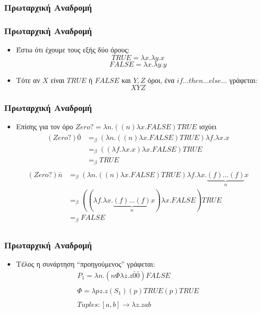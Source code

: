 \documentclass{beamer}
\begin{document}
\subsubsection{Πρωταρχική Αναδρομή}

\begin{frame}
  \frametitle{Πρωταρχική Αναδρομή}
  \begin{itemize}
  \item Έστω ότι έχουμε τους εξής δύο όρους:
    $$ TRUE = \lambda x. \lambda y. x $$
    $$ FALSE = \lambda x. \lambda y. y $$
    \pause
  \item Τότε αν $X$ είναι $TRUE$ ή $FALSE$ και $Y,Z$ όροι, ένα
    $if\ldots then \ldots else \ldots$ γράφεται:
    $$ XYZ $$
  \end{itemize}
\end{frame}

\begin{frame}
  \frametitle{Πρωταρχική Αναδρομή}
  \begin{itemize}
  \item Επίσης για τον όρο $Zero? = \lambda n. ((n) \lambda x . FALSE)
    TRUE$ ισχύει \pause
    $$
    \begin{array}{ll}
      (Zero?) \bar{0} & =_\beta (\lambda n. ((n) \lambda x . FALSE)
      TRUE) \lambda f. \lambda x. x \\
      & =_\beta ((\lambda f. \lambda x. x) \lambda x . FALSE) TRUE \\
      & =_\beta TRUE \\
    \end{array}
    $$                
    \pause
    $$
    \begin{array}{ll}
      (Zero?) \bar{n} & =_\beta (\lambda n. ((n) \lambda x . FALSE)
      TRUE) \lambda f . \lambda x . \underbrace{(f) \ldots (f)}_n x \\
      & =_\beta ((\lambda f . \lambda x . \underbrace{(f) \ldots (f)}_n
      x) \lambda x . FALSE) TRUE \\ & =_\beta FALSE \\
    \end{array}
    $$                
  \end{itemize}
\end{frame}

\begin{frame}
  \frametitle{Πρωταρχική Αναδρομή}
  \begin{itemize}
  \item Τέλος η συνάρτηση ``προηγούμενος'' γράφεται:
    $$
    \begin{array}{l}
       P_1 = \lambda n. (n \Phi \lambda z. z \bar{0} \bar{0}) FALSE \\ \\
       \Phi = \lambda pz. z (S_1) (p) TRUE (p) TRUE \\ \\
       Tuples: [a,b] \rightarrow \lambda z. z a b
    \end{array}
    $$
  \end{itemize}
\end{frame}
\end{document}
